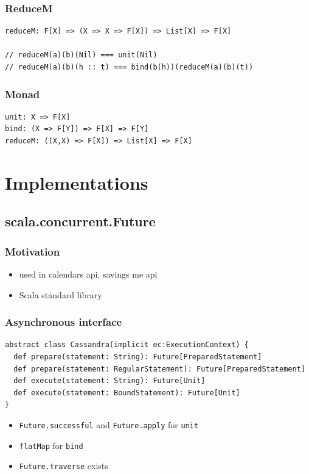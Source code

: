 \documentclass{beamer}
\begin{document}
\begin{frame}[fragile]
\frametitle{ReduceM}
\begin{lstlisting}
reduceM: F[X] => (X => X => F[X]) => List[X] => F[X]

// reduceM(a)(b)(Nil) === unit(Nil)
// reduceM(a)(b)(h :: t) === bind(b(h))(reduceM(a)(b)(t))
\end{lstlisting}
\end{frame}

\begin{frame}[fragile]
\frametitle{Monad}
\begin{lstlisting}
unit: X => F[X]
bind: (X => F[Y]) => F[X] => F[Y]
reduceM: ((X,X) => F[X]) => List[X] => F[X]
\end{lstlisting}
\end{frame}


\section{Implementations}

\subsection{scala.concurrent.Future}
\begin{frame}
\frametitle{Motivation}
\begin{itemize}
\item used in calendars api, savings me api
\item Scala standard library
\end{itemize}
\end{frame}

\begin{frame}[fragile]
\frametitle{Asynchronous interface}
\begin{lstlisting}
abstract class Cassandra(implicit ec:ExecutionContext) {
  def prepare(statement: String): Future[PreparedStatement]
  def prepare(statement: RegularStatement): Future[PreparedStatement]
  def execute(statement: String): Future[Unit]
  def execute(statement: BoundStatement): Future[Unit]
}
\end{lstlisting}
\begin{itemize}
\item \verb|Future.successful| and \verb|Future.apply| for \verb|unit|
\item \verb|flatMap| for \verb|bind|
\item \verb|Future.traverse| exists
\end{itemize}
\end{frame}
\end{document}

